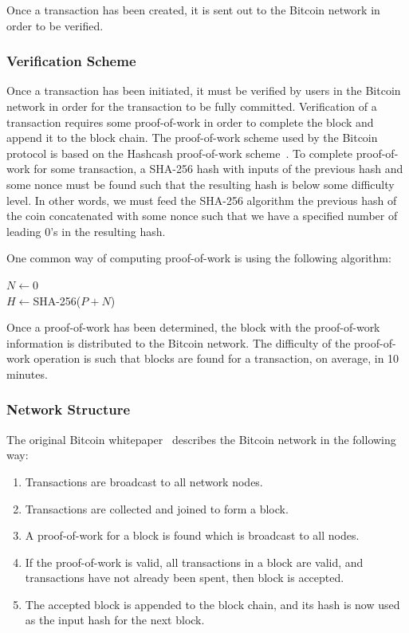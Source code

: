 \documentclass[11pt]{article}
\begin{document}
Once a transaction has been created, it is sent out to the Bitcoin network in
order to be verified.

\subsubsection{Verification Scheme}
Once a transaction has been initiated, it must be verified by users in the
Bitcoin network in order for the transaction to be fully committed. Verification
of a transaction requires some proof-of-work in order to complete the block and
append it to the block chain. The proof-of-work scheme used by the Bitcoin
protocol is based on the Hashcash proof-of-work scheme~\cite{hashcash}. 
To complete proof-of-work for some transaction, a
SHA-256 hash with inputs of the previous hash and some nonce must be found such
that the resulting hash is below some difficulty level. In other words, we must
feed the SHA-256 algorithm the previous hash of the coin concatenated with some
nonce such that we have a specified number of leading 0's in the resulting hash.

One common way of computing proof-of-work is using the following algorithm:
\begin{algorithm}
    $N \gets 0$\\
    $H \gets ${\sc SHA-256($P + N$)}\\
\end{algorithm}

Once a proof-of-work has been determined, the block with the proof-of-work
information is distributed to the Bitcoin network. The difficulty of the
proof-of-work operation is such that blocks are found for a transaction, on
average, in 10 minutes.

\subsubsection{Network Structure}
The original Bitcoin whitepaper~\cite{Nakamoto08} describes the Bitcoin network in the following
way:
\begin{enumerate}
    \item Transactions are broadcast to all network nodes.
    \item Transactions are collected and joined to form a block.
    \item A proof-of-work for a block is found which is broadcast to all nodes.
    \item If the proof-of-work is valid, all transactions in a block are valid,
        and transactions have not already been spent, then block is accepted.
    \item The accepted block is appended to the block chain, and its hash is now
        used as the input hash for the next block.
\end{enumerate}
\end{document}
